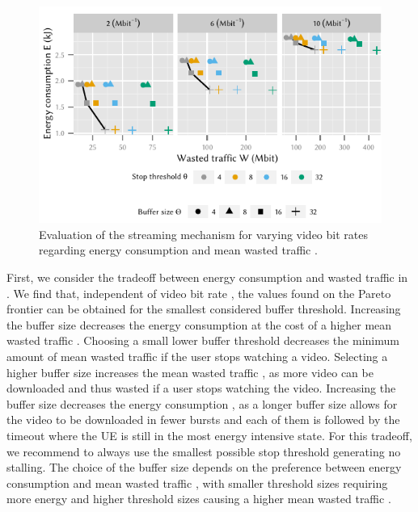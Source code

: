 \begin{figure}
  \centering
  \includegraphics{application/lte_video/trade_offs/figures/energy2lostData}
  \caption{Evaluation of the streaming mechanism for varying video bit rates \bitrate regarding energy consumption \energyconsumption and mean wasted traffic \meanwastedtraffic.}
  \label{fig:application:lte_video:numerical_evaluation:trade_offs:energy2lostData}
\end{figure}

First, we consider the tradeoff between energy consumption \energyconsumption and wasted traffic in .
We find that, independent of video bit rate \bitrate, the values found on the Pareto frontier can be obtained for the smallest considered buffer threshold.
Increasing the buffer size decreases the energy consumption \energyconsumption at the cost of a higher mean wasted traffic \meanwastedtraffic.
Choosing a small lower buffer threshold \bufferlower decreases the minimum amount of mean wasted traffic \meanwastedtraffic if the user stops watching a video.
Selecting a higher buffer size \buffersize  increases the mean wasted traffic \meanwastedtraffic, as more video can be downloaded and thus wasted if a user stops watching the video.
Increasing the buffer size \buffersize decreases the energy consumption \energyconsumption, as a longer buffer size allows for the video to be downloaded in fewer bursts and each of them is followed by the \tidle timeout where the \gls{UE} is still in the most energy intensive \rrcconnected state.
For this tradeoff, we recommend to always use the smallest possible stop threshold generating no stalling.
The choice of the buffer size depends on the preference between energy consumption \energyconsumption and mean wasted traffic \meanwastedtraffic, with smaller threshold sizes requiring more energy and higher threshold sizes causing a higher mean wasted traffic \meanwastedtraffic.

